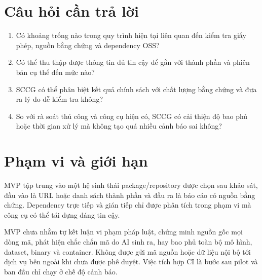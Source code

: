 \section{Câu hỏi cần trả lời}
\begin{enumerate}[label=\textbf{RQ\arabic*:}]
    \item Có khoảng trống nào trong quy trình hiện tại liên quan đến kiểm tra giấy phép, nguồn bằng chứng và dependency OSS?
    \item Có thể thu thập được thông tin đủ tin cậy để gắn với thành phần và phiên bản cụ thể đến mức nào?
    \item SCCG có thể phân biệt kết quả chính sách với chất lượng bằng chứng và đưa ra lý do dễ kiểm tra không?
    \item So với rà soát thủ công và công cụ hiện có, SCCG có cải thiện độ bao phủ hoặc thời gian xử lý mà không tạo quá nhiều cảnh báo sai không?
\end{enumerate}

\section{Phạm vi và giới hạn}
MVP tập trung vào một hệ sinh thái package/repository được chọn sau khảo sát, đầu vào là URL hoặc danh sách thành phần và đầu ra là báo cáo có nguồn bằng chứng. Dependency trực tiếp và gián tiếp chỉ được phân tích trong phạm vi mà công cụ có thể tái dựng đáng tin cậy.

MVP chưa nhằm tự kết luận vi phạm pháp luật, chứng minh nguồn gốc mọi dòng mã, phát hiện chắc chắn mã do AI sinh ra, hay bao phủ toàn bộ mô hình, dataset, binary và container. Không được gửi mã nguồn hoặc dữ liệu nội bộ tới dịch vụ bên ngoài khi chưa được phê duyệt. Việc tích hợp CI là bước sau pilot và ban đầu chỉ chạy ở chế độ cảnh báo.
